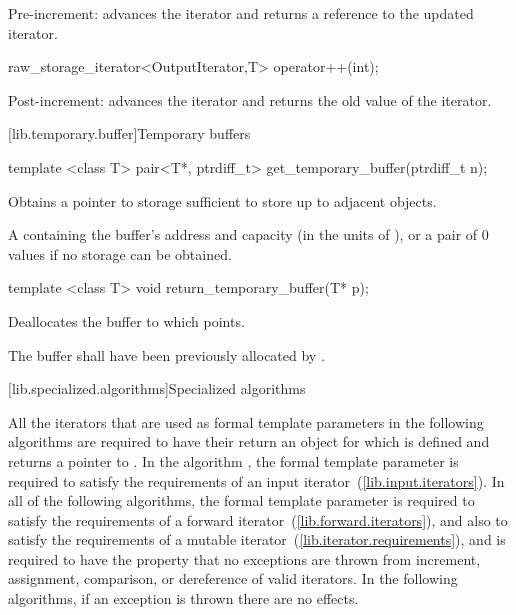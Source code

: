 \begin{itemdescr}
\pnum
\effects
Pre-increment:  advances the iterator and returns a reference to the updated iterator.
\end{itemdescr}

\begin{itemdecl}
raw_storage_iterator<OutputIterator,T> operator++(int);
\end{itemdecl}

\begin{itemdescr}
\pnum
\effects
Post-increment:  advances the iterator and returns the old value of the iterator.
\end{itemdescr}

[lib.temporary.buffer]{Temporary buffers}

%
\begin{itemdecl}
template <class T>
  pair<T*, ptrdiff_t> get_temporary_buffer(ptrdiff_t n);
\end{itemdecl}

\begin{itemdescr}
\pnum
\effects
Obtains a pointer to storage sufficient to store up to 
adjacent  objects.

\pnum
\returns
A  containing the buffer's address and capacity (in the units of
), or a pair of 0 values if no storage can be obtained.
\end{itemdescr}

%
\begin{itemdecl}
template <class T> void return_temporary_buffer(T* p);
\end{itemdecl}

\begin{itemdescr}
\pnum
\effects
Deallocates the buffer to which 
points.

\pnum
\requires
The buffer shall have been previously allocated by .
\end{itemdescr}

[lib.specialized.algorithms]{Specialized algorithms}

\pnum
All the iterators that are used as formal template parameters in the following
algorithms are required to  have their  return an object
for which  is defined and returns a pointer to .
In the algorithm , the formal template parameter
 is required to satisfy the requirements of an input
iterator~(\ref{lib.input.iterators}). In all of the following algorithms,
the formal template parameter  is required to satisfy the
requirements of a forward iterator~(\ref{lib.forward.iterators}), and also to
satisfy the requirements of a mutable iterator~(\ref{lib.iterator.requirements}),
and is required to have the property that no exceptions are thrown
from increment, assignment, comparison, or dereference of valid iterators.
In the following algorithms, if an exception is thrown there are no effects.

